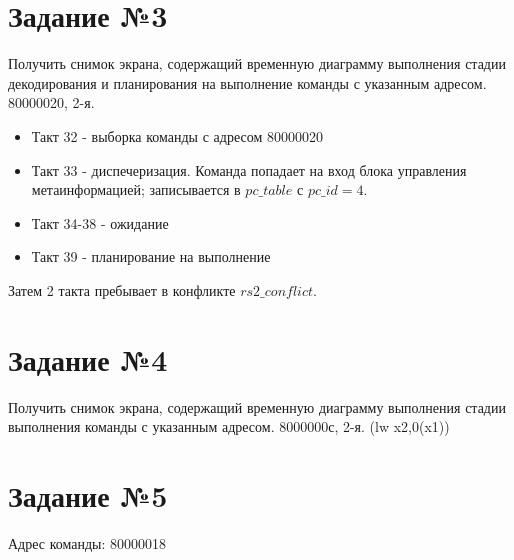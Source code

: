 \newpage

    \section{Задание №3}

        Получить снимок экрана, содержащий временную диаграмму выполнения стадии декодирования и планирования на выполнение команды с указанным адресом. 80000020, 2-я.

        
        \begin{itemize}
            \item Такт 32 - выборка команды с адресом 80000020
            \item Такт 33 - диспечеризация. Команда попадает на вход блока управления метаинформацией; записывается в \(pc\_table\) с \(pc\_id = 4\).
            \item Такт 34-38 - ожидание
            \item Такт 39 - планирование на выполнение
        \end{itemize}
        
        Затем 2 такта пребывает в конфликте \(rs2\_conflict\).

\newpage

    \section{Задание №4}
    
        Получить снимок экрана, содержащий временную диаграмму выполнения стадии выполнения команды с указанным адресом. 8000000с, 2-я. (lw x2,0(x1))
        

\newpage

    \section{Задание №5}
    
        Адрес команды: 80000018
        
        
